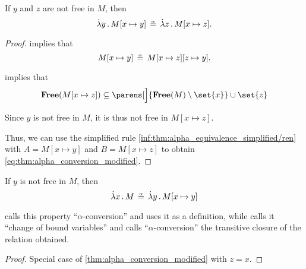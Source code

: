 \begin{corollary}\label{thm:alpha_conversion_modified}
  If \( y \) and \( z \) are not free in \( M \), then
  \begin{equation}\label{eq:thm:alpha_conversion_modified}
    \qabs y M[x \mapsto y] \aequiv \qabs z M[x \mapsto z].
  \end{equation}
\end{corollary}
\begin{proof}
   implies that
  \begin{equation*}
    M[x \mapsto y] \aequiv M[x \mapsto z][z \mapsto y].
  \end{equation*}

   implies that
  \begin{equation*}
    \op*{Free}(M[x \mapsto z]) \subseteq \parens[\Big]{ \op*{Free}(M) \setminus \set{ x } } \cup \set{ z }
  \end{equation*}

  Since \( y \) is not free in \( M \), it is thus not free in \( M[x \mapsto z] \).

  Thus, we can use the simplified rule \ref{inf:thm:alpha_equivalence_simplified/ren} with \( A = M[x \mapsto y] \) and \( B = M[x \mapsto z] \) to obtain \eqref{eq:thm:alpha_conversion_modified}.
\end{proof}

\begin{corollary}\label{thm:alpha_conversion}
  If \( y \) is not free in \( M \), then
  \begin{equation}\label{eq:thm:alpha_conversion}
    \qabs x M \aequiv \qabs y M[x \mapsto y]
  \end{equation}
\end{corollary}
\begin{comments}
  \item {} calls this property \enquote{\( \alpha \)-conversion} and uses it as a definition, while  calls it \enquote{change of bound variables} and calls \enquote{\( \alpha \)-conversion} the transitive closure of the relation obtained.
\end{comments}
\begin{proof}
  Special case of \cref{thm:alpha_conversion_modified} with \( z = x \).
\end{proof}


